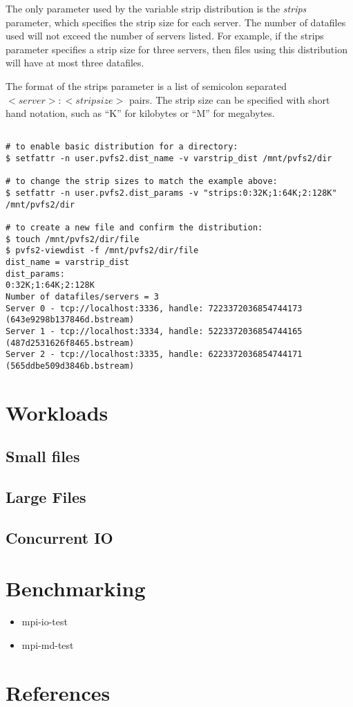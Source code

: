 \documentclass[11pt,letterpaper]{article}
\begin{document}
The only parameter used by the variable strip distribution is the
\emph{strips} parameter, which specifies the strip size for each server.
The number of datafiles used will not exceed the number of servers
listed.  For example, if the strips parameter specifies a strip size for
three servers, then files using this distribution will have at most
three datafiles.

The format of the strips parameter is a list of semicolon separated
$<server>:<strip size>$ pairs.  The strip size can be specified with short hand
notation, such as ``K'' for kilobytes or ``M'' for megabytes.

\begin{verbatim}

# to enable basic distribution for a directory:
$ setfattr -n user.pvfs2.dist_name -v varstrip_dist /mnt/pvfs2/dir

# to change the strip sizes to match the example above:
$ setfattr -n user.pvfs2.dist_params -v "strips:0:32K;1:64K;2:128K" /mnt/pvfs2/dir

# to create a new file and confirm the distribution:
$ touch /mnt/pvfs2/dir/file
$ pvfs2-viewdist -f /mnt/pvfs2/dir/file
dist_name = varstrip_dist
dist_params:
0:32K;1:64K;2:128K
Number of datafiles/servers = 3
Server 0 - tcp://localhost:3336, handle: 7223372036854744173
(643e9298b137846d.bstream)
Server 1 - tcp://localhost:3334, handle: 5223372036854744165
(487d2531626f8465.bstream)
Server 2 - tcp://localhost:3335, handle: 6223372036854744171
(565ddbe509d3846b.bstream)
\end{verbatim}

\section{Workloads}

\subsection{Small files}
\subsection{Large Files}
\subsection{Concurrent IO}

\section{Benchmarking}

\begin{itemize}
\item  mpi-io-test
\item  mpi-md-test
\end{itemize}

\section{References}
\end{document}
